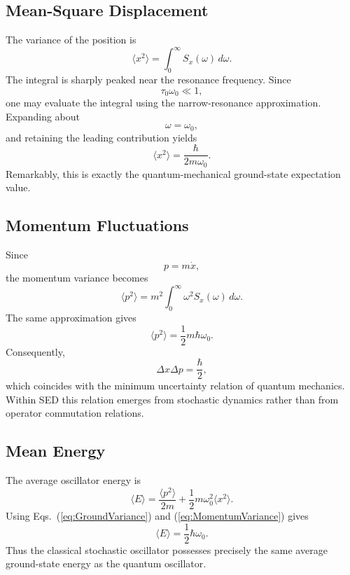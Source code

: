 \subsection{Mean-Square Displacement}
The variance of the position is
\begin{equation}
\langle x^2\rangle=\int_0^\infty S_x(\omega)\,d\omega.
\label{eq:XVarianceIntegral}
\end{equation}
The integral is sharply peaked near the resonance frequency.
Since
\[\tau_0\omega_0\ll1,\]
one may evaluate the integral using the narrow-resonance approximation.
Expanding about
\[\omega=\omega_0,\]
and retaining the leading contribution yields
\begin{equation}
\boxed{\langle x^2\rangle=\frac{\hbar}{2m\omega_0}.}
\label{eq:GroundVariance}
\end{equation}
Remarkably, this is exactly the quantum-mechanical ground-state
expectation value.
\subsection{Momentum Fluctuations}
Since
\[p=m\dot x,\]
the momentum variance becomes
\begin{equation}
\langle p^2\rangle=m^2\int_0^\infty\omega^2 S_x(\omega)\,d\omega.
\end{equation}
The same approximation gives
\begin{equation}
\boxed{\langle p^2\rangle=\frac12 m\hbar\omega_0.}
\label{eq:MomentumVariance}
\end{equation}
Consequently,
\begin{equation}
\Delta x \Delta p=\frac{\hbar}{2},
\end{equation}
which coincides with the minimum uncertainty relation of quantum
mechanics.
Within SED this relation emerges from stochastic dynamics rather than
from operator commutation relations.
\subsection{Mean Energy}
The average oscillator energy is
\begin{equation}
\langle E\rangle=\frac{\langle p^2\rangle}{2m}+\frac12 m\omega_0^2
    \langle x^2\rangle .
\end{equation}
Using Eqs.~(\ref{eq:GroundVariance}) and
(\ref{eq:MomentumVariance}) gives
\begin{equation}
\boxed{\langle E\rangle=\frac12\hbar\omega_0.}
\label{eq:GroundEnergy}
\end{equation}
Thus the classical stochastic oscillator possesses precisely the same
average ground-state energy as the quantum oscillator.
